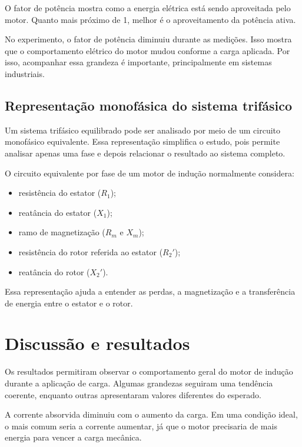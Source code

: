 \documentclass[12pt,a4paper]{article}
\begin{document}
O fator de potência mostra como a energia elétrica está sendo aproveitada pelo motor. Quanto mais próximo de 1, melhor é o aproveitamento da potência ativa.

No experimento, o fator de potência diminuiu durante as medições. Isso mostra que o comportamento elétrico do motor mudou conforme a carga aplicada. Por isso, acompanhar essa grandeza é importante, principalmente em sistemas industriais.

\subsection{Representação monofásica do sistema trifásico}

Um sistema trifásico equilibrado pode ser analisado por meio de um circuito monofásico equivalente. Essa representação simplifica o estudo, pois permite analisar apenas uma fase e depois relacionar o resultado ao sistema completo.

O circuito equivalente por fase de um motor de indução normalmente considera:

\begin{itemize}
\item resistência do estator ($R_1$);
\item reatância do estator ($X_1$);
\item ramo de magnetização ($R_m$ e $X_m$);
\item resistência do rotor referida ao estator ($R_2'$);
\item reatância do rotor ($X_2'$).
\end{itemize}

Essa representação ajuda a entender as perdas, a magnetização e a transferência de energia entre o estator e o rotor.

\newpage

\section{Discussão e resultados}

Os resultados permitiram observar o comportamento geral do motor de indução durante a aplicação de carga. Algumas grandezas seguiram uma tendência coerente, enquanto outras apresentaram valores diferentes do esperado.

A corrente absorvida diminuiu com o aumento da carga. Em uma condição ideal, o mais comum seria a corrente aumentar, já que o motor precisaria de mais energia para vencer a carga mecânica.
\end{document}
